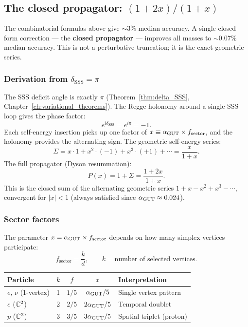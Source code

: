 \subsection{The closed propagator: $(1+2x)/(1+x)$}
\label{sec:closed_propagator}

The combinatorial formulas above give $\sim 3\%$ median accuracy.  A single closed-form correction --- the \textbf{closed propagator} --- improves all masses to $\sim 0.07\%$ median accuracy.  This is not a perturbative truncation; it is the exact geometric series.

\subsubsection{Derivation from $\delta_\mathrm{SSS} = \pi$}

The SSS deficit angle is exactly $\pi$ (Theorem~\ref{thm:delta_SSS}, Chapter~\ref{ch:variational_theorems}).  The Regge holonomy around a single SSS loop gives the phase factor:
\begin{equation}
e^{i\delta_\mathrm{SSS}} = e^{i\pi} = -1.
\end{equation}
Each self-energy insertion picks up one factor of $x \equiv \alpha_{\mathrm{GUT}} \times f_\mathrm{sector}$, and the holonomy provides the alternating sign.  The geometric self-energy series:
\begin{equation}
\Sigma = x \cdot 1 + x^2 \cdot (-1) + x^3 \cdot (+1) + \cdots = \frac{x}{1 + x}.
\end{equation}
The full propagator (Dyson resummation):
\begin{equation}
\label{eq:closed_propagator}
\boxed{P(x) = 1 + \Sigma = \frac{1 + 2x}{1 + x}.}
\end{equation}
This is the closed sum of the alternating geometric series $1 + x - x^2 + x^3 - \cdots$, convergent for $|x| < 1$ (always satisfied since $\alpha_{\mathrm{GUT}} \approx 0.024$).

\subsubsection{Sector factors}

The parameter $x = \alpha_{\mathrm{GUT}} \times f_\mathrm{sector}$ depends on how many simplex vertices participate:
\begin{equation}
f_\mathrm{sector} = \frac{k}{d}, \qquad k = \text{number of selected vertices.}
\end{equation}
\begin{center}
\begin{tabular}{lcccl}
\hline
Particle & $k$ & $f$ & $x$ & Interpretation \\
\hline
$e$, $\nu$ (1-vertex) & 1 & $1/5$ & $\alpha_{\mathrm{GUT}}/5$ & Single vertex pattern \\
$e$ ($\mathbb{C}^2$) & 2 & $2/5$ & $2\alpha_{\mathrm{GUT}}/5$ & Temporal doublet \\
$p$ ($\mathbb{C}^3$) & 3 & $3/5$ & $3\alpha_{\mathrm{GUT}}/5$ & Spatial triplet (proton) \\
\hline
\end{tabular}
\end{center}

